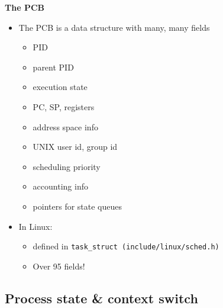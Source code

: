 \documentclass[11pt,a4paper]{article}
\begin{document}
\textbf{The PCB}
\begin{itemize}
    \item The PCB is a data structure with many, many fields
        \begin{itemize}
            \item PID
            \item parent PID
            \item execution state
            \item PC, SP, registers
            \item address space info
            \item UNIX user id, group id
            \item scheduling priority
            \item accounting info
            \item pointers for state queues
        \end{itemize}
    \item In Linux:
        \begin{itemize}
            \item defined in \texttt{task\_struct (include/linux/sched.h)}
            \item Over 95 fields!
        \end{itemize}
\end{itemize}

\subsection{Process state \& context switch}
\end{document}

